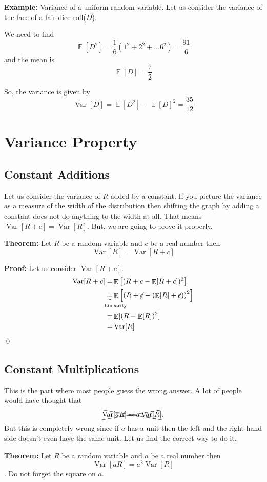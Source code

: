 \documentclass[a4paper, 12pt]{article}
\newcommand{\theorem}{\vspace{1em}\noindent\textbf{Theorem:} }
\newcommand{\example}{\vspace{1em}\noindent\textbf{Example:} }
\renewcommand{\proof}{\vspace{0.5em}\noindent\textbf{Proof:} }
\newcommand{\qedd}{\qed\newline}
\newcommand{\expl}[2]{%
	\underset{\substack{\uparrow\\\mathrlap{\text{\hspace{-1em}#2}}}}{#1}}
\DeclareMathOperator{\E}{\mathbb{E}}
\DeclareMathOperator{\Var}{Var}
\begin{document}
\begin{multicols}{2}
\example Variance of a uniform random variable. Let us consider the variance of the face of a fair dice roll($D$).

We need to find
\[
	\E[D^2] = \frac{1}{6} (1^2 + 2^2 +\ldots 6^2) = \frac{91}{6}
\]
and the mean is
\[
	\E[D] = \frac{7}{2}
\]

So, the variance is given by
\[
	\Var[D] = \E[D^2] - \E[D]^2 = \frac{35}{12}
\]

\section*{Variance Property}

\subsection*{Constant Additions}

Let us consider the variance of $R$ added by a constant. If you picture the variance as a measure of the width of the distribution then shifting the graph by adding a constant does not do anything to the width at all. That means $\Var[R+c] = \Var[R]$. But, we are going to prove it properly.

\theorem Let $R$ be a random variable and $c$ be a real number then
\[
	\Var[R] = \Var[R+c]
\]

\proof Let us consider $\Var[R+c]$.
\begin{align*}
	\Var[R+c] =& \E\left[(R+c - \E[R+c])^2\right]\\
	\expl{=}{Linearity}& \E\left[\left(R+\cancel{c} - (\E[R] + \cancel{c}) \right)^2\right]\\
	=& \E[(R - \E[R])^2]\\
	=& \Var[R]
\end{align*}
\qedd

\subsection*{Constant Multiplications}

This is the part where most people guess the wrong answer. A lot of people would have thought that
\[
	\xcancel{\Var[aR] = a \Var[R]}.
\]
But this is completely wrong since if $a$ has a unit then the left and the right hand side doesn't even have the same unit. Let us find the correct way to do it.

\theorem Let $R$ be a random variable and $a$ be a real number then
\[
	\Var[aR] = a^2\Var[R]
\].
Do not forget the square on $a$.


\end{multicols}
\end{document}
